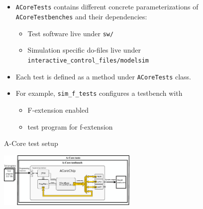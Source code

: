 \documentclass{sdkslides}
\begin{document}
\subsection*{\sectionname}
\begin{frame}[t,fragile]
    \frametitle{\sectionname}
    \begin{itemize}
        \item \verb|ACoreTests| contains different concrete parameterizations
            of \verb|ACoreTestbenches| and their dependencies:
        \begin{itemize}
            \item Test software live under \verb|sw/|
            \item Simulation specific do-files live under
                \verb|interactive_control_files/modelsim|
        \end{itemize}
        \item Each test is defined as a method under \verb|ACoreTests| class.
        \item For example, \verb|sim_f_tests| configures a testbench with
            \begin{itemize}
                \item F-extension enabled
                \item test program for f-extension
            \end{itemize}
    \end{itemize}
    \begin{block}{A-Core test setup}
        \begin{center}
            \includegraphics[width=0.5\textwidth]{./Pics/A-Core_testsetup.eps}
        \end{center}
    \end{block}
\end{frame}

\renewcommand{\sectionname}{ACoreTests}
\end{document}
